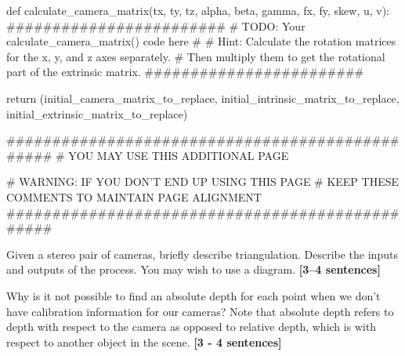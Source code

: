 \documentclass{csci1430}
\begin{document}
\begin{answer}[height=46]
\begin{python}
def calculate_camera_matrix(tx, ty, tz, alpha, beta, gamma, fx, fy, skew, u, v):
    ########################
    # TODO: Your calculate_camera_matrix() code here #
    # Hint: Calculate the rotation matrices for the x, y, and z axes separately.
    # Then multiply them to get the rotational part of the extrinsic matrix.
    ########################
    
    return (initial_camera_matrix_to_replace, 
    initial_intrinsic_matrix_to_replace, 
    initial_extrinsic_matrix_to_replace)
\end{python}
\end{answer}

\pagebreak
\begin{answer}[height=46]
\begin{python}
################################################
# YOU MAY USE THIS ADDITIONAL PAGE

# WARNING: IF YOU DON'T END UP USING THIS PAGE
# KEEP THESE COMMENTS TO MAINTAIN PAGE ALIGNMENT
################################################
\end{python}
\end{answer}
    


\pagebreak
\begin{question}[points=4,drawbox=false]
\end{question}

\begin{subquestion}[points=2]
Given a stereo pair of cameras, briefly describe triangulation. Describe the inputs and outputs of the process. You may wish to use a diagram. \textbf{[3--4 sentences]}
\end{subquestion}

\begin{answer}[height=30]
\end{answer}

\pagebreak
\begin{subquestion}[points=2]
Why is it not possible to find an absolute depth for each point when we don't have calibration information for our cameras? Note that absolute depth refers to depth with respect to the camera as opposed to relative depth, which is with respect to another object in the scene. \textbf{[3 - 4 sentences]}
\end{subquestion}

\begin{answer}[height=10]
\end{answer}
\end{document}
